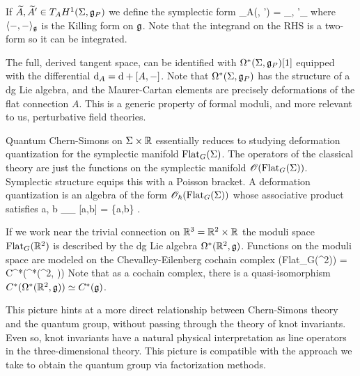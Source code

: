 \documentclass[10pt]{amsart}
\begin{document}
If $\widetilde{A}, \widetilde{A}' \in T_A H^1(\Sigma, \mathfrak g_P)$ we define the symplectic form
\ben
\omega_A(, ') = \int_\Sigma \<, '\>_\fg
\een
where $\langle-,-\rangle_\mathfrak g$ is the Killing form on $\mathfrak g$. 
Note that the integrand on the RHS is a two-form so it can be integrated.

The full, derived tangent space, can be identified with $\Omega^*(\Sigma, \mathfrak g_P)[1]$ equipped with the differential ${\rm d}_A = {\rm d} + [A,-]$. 
Note that $\Omega^*(\Sigma, \mathfrak g_P)$ has the structure of a dg Lie algebra, and the Maurer-Cartan elements are precisely deformations of the flat connection $A$. 
This is a generic property of formal moduli, and more relevant to us, perturbative field theories. 

Quantum Chern-Simons on $\Sigma \times \mathbb R$ essentially reduces to studying deformation quantization for the symplectic manifold ${\rm Flat}_G(\Sigma)$. 
The operators of the classical theory are just the functions on the symplectic manifold $\mathscr O({\rm Flat}_G(\Sigma))$.
Symplectic structure equips this with a Poisson bracket. 
A deformation quantization is an algebra of the form $\mathscr O_{\hbar}({\rm Flat}_G(\Sigma))$ whose associative product satisfies
\ben
a, b \in \sO_\hbar \implies \lim_{\hbar {}}  [a,b] = \{a,b\} .
\een

If we work near the trivial connection on $\mathbb R^3 = \mathbb R^2 \times \mathbb R$ the moduli space ${\rm Flat}_G(\mathbb R^2)$ is described by the dg Lie algebra $\Omega^*(\mathbb R^2, \mathfrak g)$. 
Functions on the moduli space are modeled on the Chevalley-Eilenberg cochain complex
\ben
\sO({\rm Flat}_G(\RR^2)) = C^*(\Omega^*(\RR^2, \fg))
\een 
Note that as a cochain complex, there is a quasi-isomorphism $C^*(\Omega^*(\mathbb R^2, \mathfrak g)) \simeq C^*(\mathfrak g)$. 

\ben
{}
\een

This picture hints at a more direct relationship between Chern-Simons theory and the quantum group, without passing through the theory of knot invariants. 
Even so, knot invariants have a natural physical interpretation as line operators in the three-dimensional theory. 
This picture is compatible with the approach we take to obtain the quantum group via factorization methods.
\end{document}
